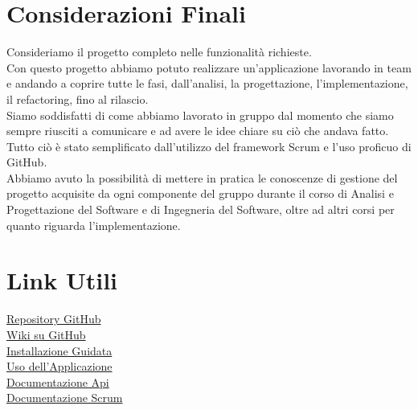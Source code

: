 \documentclass[a4paper,12pt]{report}
\begin{document}
	\section{Considerazioni Finali}
Consideriamo il progetto completo nelle funzionalità richieste.\\
Con questo progetto abbiamo potuto realizzare un'applicazione lavorando in team e andando a coprire tutte le fasi, dall'analisi, la progettazione, l'implementazione, il refactoring, fino al rilascio.\\
Siamo soddisfatti di come abbiamo lavorato in gruppo dal momento che siamo sempre riusciti a comunicare e ad avere le idee chiare su ciò che andava fatto. Tutto ciò è stato semplificato dall'utilizzo del framework Scrum e l'uso proficuo di GitHub.\\
Abbiamo avuto la possibilità di mettere in pratica le conoscenze di gestione del progetto acquisite da ogni componente del gruppo durante il corso di Analisi e Progettazione del Software e di Ingegneria del Software, oltre ad altri corsi per quanto riguarda l'implementazione.\\
 
	
	
 	\section{Link Utili}  
	\href{https://GitHub.com/lta-unimib/progetto-brew-day-1-brew-day-birra}{Repository GitHub}\\
	\href{https://GitHub.com/lta-unimib/progetto-brew-day-1-brew-day-birra/wiki}{Wiki su GitHub}\\
	\href{https://GitHub.com/lta-unimib/progetto-brew-day-1-brew-day-birra/wiki/Installazione-Guidata}{Installazione Guidata}\\
	\href{https://GitHub.com/lta-unimib/progetto-brew-day-1-brew-day-birra/wiki/Uso-dell'Applicazione}{Uso dell'Applicazione}\\
	\href{https://GitHub.com/lta-unimib/progetto-brew-day-1-brew-day-birra/tree/master/backend#readme}{Documentazione Api}\\
	\href{https://GitHub.com/lta-unimib/progetto-brew-day-1-brew-day-birra/tree/master/scrum}{Documentazione Scrum}\\
\end{document}
